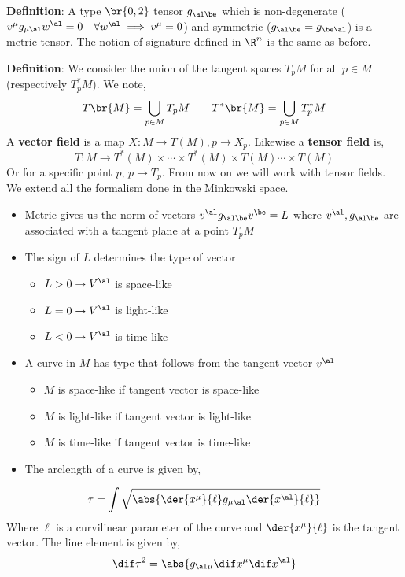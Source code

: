 \documentclass{article}
\begin{document}
\textbf{Definition}: A type $\br{0,2}$ tensor $g_{\al\be}$ which is non-degenerate ($v^\mu g_{\mu\al} w^\al = 0 \quad \forall w^\al \implies v^\mu = 0$) and symmetric ($g_{\al\be} = g_{\be\al}$) is a metric tensor. The notion of signature defined in $\R^n$ is the same as before.

\textbf{Definition}: We consider the union of the tangent spaces $T_pM$ for all $p\in M$ (respectively $T^*_pM$). We note,
\[ T\br{M} = \bigcup_{p\in M} T_p M \qquad T^*\br{M} = \bigcup_{p\in M} T^*_p M \]
A \textbf{vector field} is a map $X : M \to T(M), p \to X_p$. Likewise a \textbf{tensor field} is,
\[ T : M \to T^*(M) \times \cdots \times T^*(M) \times T(M) \cdots \times T(M) \]
Or for a specific point $p$, $p \to T_p$. From now on we will work with tensor fields. We extend all the formalism done in the Minkowski space.
\begin{itemize}
    \item Metric gives us the norm of vectors $ v^\al g_{\al\be} v^\be = L $ where $v^\al,g_{\al\be}$ are associated with a tangent plane at a point $T_pM$
    \item The sign of $L$ determines the type of vector
    \begin{itemize}
        \item $L > 0 \to V^\al$ is space-like
        \item $L = 0 \to V^\al$ is light-like
        \item $L < 0 \to V^\al$ is time-like
    \end{itemize}
    \item A curve in $M$ has type that follows from the tangent vector $v^\al$
    \begin{itemize}
        \item $M$ is space-like if tangent vector is space-like
        \item $M$ is light-like if tangent vector is light-like
        \item $M$ is time-like if tangent vector is time-like
    \end{itemize}
    \item The arclength of a curve is given by,
\end{itemize}

\[ \tau = \int \sqrt{\abs{\der{x^\mu}{\ell}g_{\mu\al}\der{x^\al}{\ell}}} \]
Where $\ell$ is a curvilinear parameter of the curve and $\der{x^\mu}{\ell}$ is the tangent vector. The line element is given by,
\[ \dif \tau^2 = \abs{g_{\al\mu}\dif x^\mu \dif x^\al} \]
\end{document}
